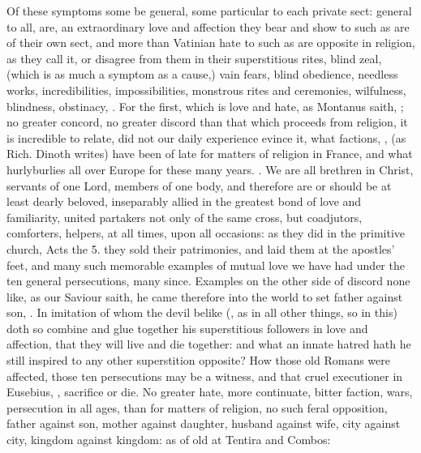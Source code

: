 {Of these symptoms some be general, some particular to each private
sect: general to all, are, an extraordinary love and affection they
bear and show to such as are of their own sect, and more than Vatinian
hate to such as are opposite in religion, as they call it, or disagree
from them in their superstitious rites, blind zeal, (which is as much a
symptom as a cause,) vain fears, blind obedience, needless works,
incredibilities, impossibilities, monstrous rites and ceremonies,
wilfulness, blindness, obstinacy, \etc{}. For the first, which is love and
hate, as Montanus saith, ; no
greater concord, no greater discord than that which proceeds from
religion, it is incredible to relate, did not our daily experience
evince it, what factions, , (as Rich. Dinoth writes) have been of late for matters of religion in France, and
what hurlyburlies all over Europe for these many years. . We are all brethren in
Christ, servants of one Lord, members of one body, and therefore are or
should be at least dearly beloved, inseparably allied in the greatest
bond of love and familiarity, united partakers not only of the same
cross, but coadjutors, comforters, helpers, at all times, upon all
occasions: as they did in the primitive church, Acts the 5. they sold
their patrimonies, and laid them at the apostles' feet, and many such
memorable examples of mutual love we have had under the ten general
persecutions, many since. Examples on the other side of discord none
like, as our Saviour saith, he came therefore into the world to set
father against son, \etc{}. In imitation of whom the devil belike
(, as in all other things, so in
this) doth so combine and glue together his superstitious followers in
love and affection, that they will live and die together: and what an
innate hatred hath he still inspired to any other superstition
opposite? How those old Romans were affected, those ten persecutions
may be a witness, and that cruel executioner in Eusebius, , sacrifice or die. No greater hate, more continuate, bitter
faction, wars, persecution in all ages, than for matters of religion,
no such feral opposition, father against son, mother against daughter,
husband against wife, city against city, kingdom against kingdom: as of
old at Tentira and Combos:

}
